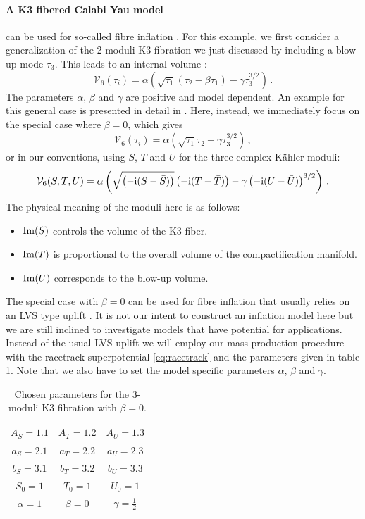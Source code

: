 \documentclass[a4paper,12pt]{report}
\newcommand{\be}{\begin{equation}}
\newcommand{\ee}{\end{equation}}
\def\rmi{{\rm i}}
\def\rmim{{\rm Im}}
\begin{document}
\paragraph{A K3 fibered Calabi Yau model} can be used for so-called fibre inflation \cite{Cicoli:2008gp,Burgess:2016owb,Kallosh:2017wku}. For this example, we first consider a generalization of the 2 moduli K3 fibration we just discussed by including a blow-up mode $\tau_3$. This leads to an internal volume \cite{Cicoli:2008gp}:
\be 
\mathcal{V}_6 (\tau_i) = \alpha \left( \sqrt{\tau_1} (\tau_2 - \beta \tau_1 ) - \gamma \tau_3^{3/2} \right)\,.
\ee
The parameters $\alpha$, $\beta$ and $\gamma$ are positive and model dependent. An example for this general case is presented in detail in \cite{Cribiori:2019drf}. Here, instead, we immediately focus on the special case where $\beta = 0$, which gives
\be 
\mathcal{V}_6 (\tau_i) = \alpha \left( \sqrt{\tau_1} \tau_2  - \gamma \tau_3^{3/2} \right)\,,
\ee
or in our conventions, using $S$, $T$ and $U$ for the three complex Kähler moduli:
\be 
\mathcal{V}_6 (S,T,U) = \alpha \left( \sqrt{\left(-\rmi ( S- \bar{S})\right)} \left(-\rmi (T-\bar{T})\right) - \gamma \left(-\rmi (U-\bar{U})\right)^{3/2} \right)\,.
\ee
The physical meaning of the moduli here is as follows:
\begin{itemize}
\item $\rmim(S)$ controls the volume of the K3 fiber.
\item $\rmim(T)$ is proportional to the overall volume of the compactification manifold.
\item $\rmim(U)$ corresponds to the blow-up volume.
\end{itemize}
The special case with $\beta=0$ can be used for fibre inflation that usually relies on an LVS type uplift \cite{Balasubramanian:2005zx}. It is not our intent to construct an inflation model here but we are still inclined to investigate models that have potential for applications. Instead of the usual LVS uplift we will employ our mass production procedure with the racetrack superpotential \eqref{eq:racetrack} and the parameters given in table \ref{tab:fibrepara}. Note that we also have to set the model specific parameters $\alpha$, $\beta$ and $\gamma$.
\begin{table}[htb]
\centering
\begin{tabular}{|c|c|c|}\hline
$A_S = 1.1$ & $A_T = 1.2$ & $A_U =1.3$\\\hline
$a_S = 2.1$ & $a_T = 2.2$ & $a_U = 2.3$\\\hline
$b_S = 3.1$ & $b_T = 3.2$ & $b_U = 3.3$\\\hline
$S_0 = 1$ & $T_0 = 1$ & $U_0 = 1$\\\hline
$\alpha = 1$ & $\beta=0$ & $\gamma = \frac{1}{2} $ \\\hline
\end{tabular}
\caption{  Chosen parameters for the 3-moduli K3 fibration with $\beta = 0$.}
\label{tab:fibrepara}
\end{table}
\end{document}

